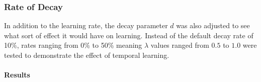 
\subsubsection*{Rate of Decay}
\label{sec:findings-expts-decay}

In addition to the learning rate,
the decay parameter $d$ was also adjusted to see what sort of effect it
would have on learning.
%
Instead of the default decay rate of 10\%,
rates ranging from 0\% to 50\%\textemdash
meaning $\lambda$ values ranged from $0.5$ to $1.0$\textemdash
were tested to demonstrate the effect of temporal learning.

\paragraph*{Results}

